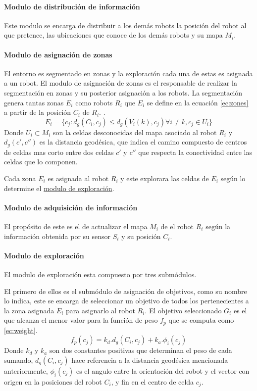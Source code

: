 \paragraph{Modulo de distribución de información}
Este modulo se encarga de distribuir a los demás robots la posición del robot al que pretence, las ubicaciones que conoce de los demás robots y su mapa $M_i$. 

\paragraph{Modulo de asignación de zonas }
El entorno es segmentado en zonas y la exploración cada una de estas es asignada a un robot. El modulo de asignación de zonas es el responsable de realizar la segmentación en zonas y su posterior asignación a los robots. La segmentación genera tantas zonas $E_i$ como robots $R_i$ que $E_i$ se define en la ecuación \ref{ec:zones} a partir de la posición $C_i$ de $R_i$. .
\begin{equation}\label{ec:zones}
  E_i=\{c_j:d_g(C_i,c_j)\leq d_g(V_i(k),c_j) \forall i \neq k , c_j \in U_i\}
\end{equation}
Donde $U_i \subset M_i$ son la celdas desconocidas del mapa asociado al robot $R_i$ y $d_g(c',c'')$ es la distancia geodésica, que indica el camino compuesto de centros de celdas mas corto entre dos celdas $c'$ y $c''$ que respecta la conectividad entre las celdas que lo componen.

Cada zona $E_i$ es asignada al robot $R_i$ y este explorara las celdas de $E_i$ según lo determine el \hyperref[par:estar:moduloexp]{modulo de exploración}.

\paragraph{Modulo de adquisición de información}
El propósito de este es el de actualizar el mapa $M_i$ de el robot $R_i$ según la información obtenida por su sensor $S_i$ y su posición $C_i$.

\paragraph{Modulo de exploración}\label{par:estar:moduloexp}
El modulo de exploración esta compuesto por tres submódulos. 

El primero de ellos es el submódulo de asignación de objetivos, como su nombre lo indica, este se encarga de seleccionar un objetivo de todos los pertenecientes a la zona asignada $E_i$ para asignarlo al robot $R_i$. El objetivo seleccionado $G_i$ es el que alcanza el menor valor para la función de peso $f_p$ que se computa como \ref{ec:weight}.
\begin{equation}\label{ec:weight}
  f_p(c_j) = k_d.d_g(C_i,c_j) + k_a.\phi_i(c_j)
\end{equation}
Donde $k_d$ y $k_a$ son dos constantes positivas que determinan el peso de cada sumando, $d_g(C_i,c_j)$ hace referencia a la distancia geodésica mencionada anteriormente, $\phi_i(c_j)$ es el angulo entre la orientación del robot y el vector con origen en la posiciones del robot $C_i$, y fin en el centro de celda $c_j$. 

